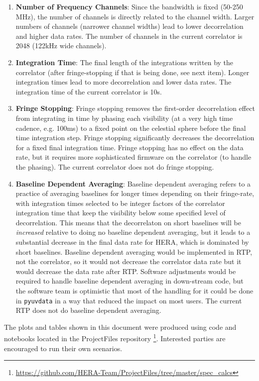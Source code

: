 \documentclass{article}
\begin{document}
\begin{enumerate}
\item \textbf{Number of Frequency Channels}: Since the bandwidth is fixed (50-250 MHz), the number of channels is directly related to the channel 
width. Larger numbers of channels (narrower channel widths) lead to lower decorrelation and higher data rates. The number of channels in the current 
correlator is 2048 (122kHz wide channels).
\item \textbf{Integration Time}: The final length of the integrations written by the correlator (after fringe-stopping if that is being done, see next item). 
Longer integration times lead to more decorrelation and lower data rates. The integration time of the current correlator is 10s.
\item \textbf{Fringe Stopping}: Fringe stopping removes the first-order decorrelation effect from integrating in time by phasing each visibility (at a very 
high time cadence, e.g. 100ms) to a fixed point on the celestial sphere before the final time integration step. Fringe stopping significantly decreases 
the decorrelation for a fixed final integration time. Fringe stopping has no effect on the data rate, but it requires more sophisticated firmware on the 
correlator (to handle the phasing). The current correlator does not do fringe stopping.
\item \textbf{Baseline Dependent Averaging}: Baseline dependent averaging refers to a practice of averaging baselines for longer times depending on 
their fringe-rate, with integration times selected to be integer factors of the correlator integration time that keep the visibility below some specified 
level of decorrelation. This means that the decorrelaton on short baselines will be \textit{increased} relative to doing no baseline dependent 
averaging, but it leads to a substantial decrease in the final data rate for HERA, which is dominated by short baselines. Baseline dependent 
averaging would be implemented in RTP, not the correlator, so it would not decrease the correlator data rate but it would decrease the data rate after 
RTP. Software adjustments would be required to handle baseline dependent averaging in down-stream code, but the software team is optimistic that 
most of the handling for it could be done in \texttt{pyuvdata} in a way that reduced the impact on most users. The current RTP does not do baseline 
dependent averaging.
\end{enumerate}

The plots and tables shown in this document were produced using code and notebooks located in the ProjectFiles repository \footnote{\label{code_link} \url{https://github.com/HERA-Team/ProjectFiles/tree/master/spec_calcs}}. Interested parties are encouraged to run their own scenarios.
\end{document}
